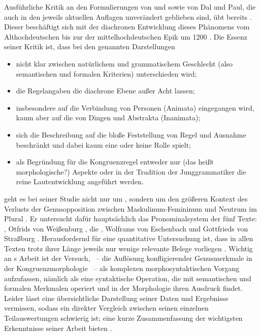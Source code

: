 Ausführliche Kritik an den Formulierungen von \citet{grimm1890,grimm1898} und
\citet{behaghel1928} sowie von Dal\nocite{dal2014} und Paul\nocite{paul2007},
die auch in den jeweils aktuellen Auflagen
\autocite{dal2014,paul2007} unverändert geblieben sind, übt bereits
\citet[11--15, 195--213]{askedal1973}. Dieser beschäftigt sich mit der
diachronen Entwicklung dieses Phänomens vom
Althochdeutschen bis zur  der
mittelhochdeutschen Epik um 1200
\autocites[vgl.][317]{schneidermohr2001}[dazu auch][3--29]{johnson1999}. Die
Essenz seiner Kritik ist, dass bei den genannten Darstellungen

\begin{itemize}
	\item nicht klar zwischen natürlichem und grammatischem Geschlecht (also
		semantischen und formalen Kriterien) unterschieden wird;
	\item die Regelangaben die diachrone Ebene außer Acht
		lassen;
	\item insbesondere auf die Verbindung von Personen (Animata)
		eingegangen wird, kaum aber auf die von Dingen und Abstrakta
		(Inanimata);
	\item sich die Beschreibung auf die bloße Feststellung von Regel und
		Ausnahme beschränkt und dabei  kaum eine
		oder keine Rolle spielt;
	\item als Begründung für die Kongruenzregel entweder nur  (das
		heißt morphologische?) Aspekte oder in der Tradition der
		Junggrammatiker die reine Lautentwicklung angeführt werden.
\end{itemize}

\citet{askedal1973} geht es bei seiner Studie nicht nur um
, sondern um den größeren Kontext des Verlusts der
Genusopposition zwischen Maskulinum-Femininum und Neutrum im Plural
\autocite[169--177]{askedal1973}. Er untersucht dafür hauptsächlich das
Pronominalsystem der fünf Texte: , Otfrids von Weißenburg , die , Wolframs
von Eschenbach
 und Gottfrieds von Straßburg
. Herausfordernd für eine quantitative Untersuchung ist, dass in
allen Texten trotz ihrer Länge jeweils nur wenige relevante Belege vorliegen
\autocites[187]{askedal1973}[118]{fleischerschallert2011}. Wichtig an
\citeauthor{askedal1973}s Arbeit ist der Versuch, ~-- die Auflösung konfligierender
Genusmerkmale in der Kongruenz\-morphologie \autocites(siehe
){corbett1983}~-- als komplexen morphosyntaktischen
Vorgang aufzufassen, nämlich als eine syntaktische Operation, die mit
semantischen und formalen Merkmalen operiert und in der Morphologie ihren
Ausdruck findet. Leider lässt \citet{askedal1973} eine übersichtliche
Darstellung seiner Daten und Ergebnisse vermissen, sodass ein direkter
Vergleich zwischen seinen einzelnen Teilauswertungen schwierig ist; eine kurze
Zusammenfassung der wichtigsten Erkenntnisse seiner Arbeit bieten
\citet[118--119]{fleischerschallert2011}.

